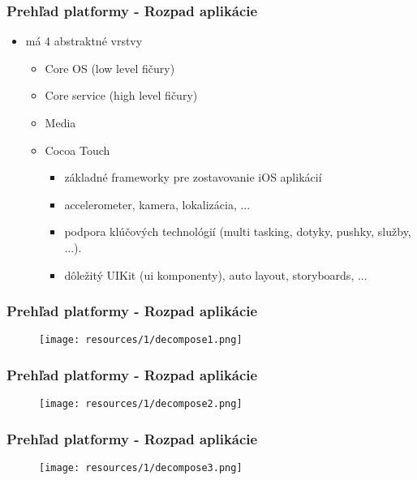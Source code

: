 \documentclass[serif,mathserif]{beamer}
\begin{document}
\begin{frame}
  \frametitle{Prehľad platformy - Rozpad aplikácie}
  \begin{itemize}
	\item má 4 abstraktné vrstvy
	\begin{itemize}
	\item Core OS (low level fičury)
	\item Core service (high level fičury)
	\item Media
	\item Cocoa Touch\pause
	\begin{itemize}
	\item základné frameworky pre zostavovanie iOS aplikácií\pause
	\item accelerometer, kamera, lokalizácia, ...\pause
	\item podpora klúčových technológií (multi tasking, dotyky, pushky, služby, ...).\pause 
	\item dôležitý UIKit (ui komponenty), auto layout,  storyboards, ... 
  \end{itemize}
  \end{itemize}
  \end{itemize}
\end{frame}

\begin{frame}
  \frametitle{Prehľad platformy - Rozpad aplikácie}
  \begin{figure}[h]
	\texttt{[image: resources/1/decompose1.png]}
  \end{figure}
\end{frame}

\begin{frame}
  \frametitle{Prehľad platformy - Rozpad aplikácie}
  \begin{figure}[h]
	\texttt{[image: resources/1/decompose2.png]}
  \end{figure}
\end{frame}

\begin{frame}
  \frametitle{Prehľad platformy - Rozpad aplikácie}
  \begin{figure}[h]
	\texttt{[image: resources/1/decompose3.png]}
  \end{figure}
\end{frame}
\end{document}
